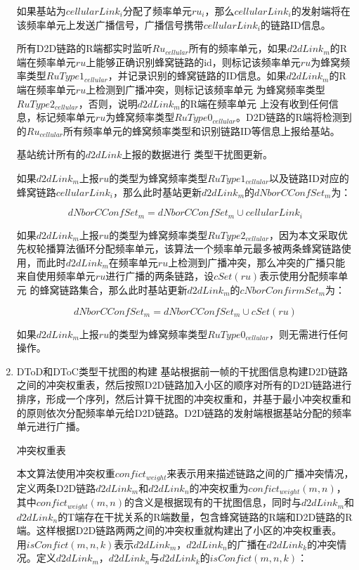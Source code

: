 \documentclass[figurelist,tablelist,algorithmlist,nomlist,masters]{seuthesix}
\begin{document}
\begin{enumerate}
		如果基站为$cellularLin{k_i}$分配了频率单元$r{u_i}$，那么$cellularLin{k_i}$的发射端将在该频率单元上发送广播信号，广播信号携带$cellularLin{k_i}$的链路ID信息。
		
		所有D2D链路的R端都实时监听$R{u_{cellular}}$所有的频率单元，如果$d2dLin{k_m}$的R端在频率单元$ru$上能够正确识别蜂窝链路的id，则标记该频率单元$ru$为蜂窝频率类型$RuType{1_{cellular}}$，并记录识别的蜂窝链路的ID信息。如果$d2dLin{k_m}$的R端在频率单元$ru$上检测到广播冲突，则标记该频率单元 为蜂窝频率类型$RuType{2_{cellular}}$，否则，说明$d2dLin{k_m}$的R端在频率单元 上没有收到任何信息，标记频率单元$ru$为蜂窝频率类型$RuType{0_{cellular}}$。D2D链路的R端将检测到的$R{u_{cellular}}$所有频率单元的蜂窝频率类型和识别链路ID等信息上报给基站。
		
		基站统计所有的$d2dLink$上报的数据进行 类型干扰图更新。
		
		如果$d2dLin{k_m}$上报$ru$的类型为蜂窝频率类型$RuType{1_{cellular}}$以及链路ID对应的蜂窝链路$cellularLin{k_i}$，那么此时基站更新$d2dLin{k_m}$的$dNborCConfSe{t_m}$为：
		
		
		\begin{equation}\label{eq2.1}
		dNborCConfSe{t_m} = dNborCConfSe{t_m} \cup cellularLin{k_i}
		\end{equation}
		
		如果$d2dLin{k_m}$上报$ru$的类型为蜂窝频率类型$RuType{2_{cellular}}$，因为本文采取优先权轮播算法循环分配频率单元，该算法一个频率单元最多被两条蜂窝链路使用，而此时$d2dLin{k_m}$在频率单元$ru$上检测到广播冲突，那么冲突的广播只能来自使用频率单元$ru$进行广播的两条链路，设$cSet(ru)$表示使用分配频率单元 的蜂窝链路集合，那么此时基站更新$d2dLin{k_m}$的$cNborConfirmSe{t_m}$为：
		
		\begin{equation}\label{eq2.1}
		dNborCConfSe{t_m} = dNborCConfSe{t_m} \cup cSet(ru)
		\end{equation}
		
		如果$d2dLin{k_m}$上报$ru$的类型为蜂窝频率类型$RuType{0_{cellular}}$，则无需进行任何操作。
		
		\item DToD和DToC类型干扰图的构建
		基站根据前一帧的干扰图信息构建D2D链路之间的冲突权重表，然后按照D2D链路加入小区的顺序对所有的D2D链路进行排序，形成一个序列，然后计算干扰图的冲突权重和，并基于最小冲突权重和的原则依次分配频率单元给D2D链路。D2D链路的发射端根据基站分配的频率单元进行广播。
		
		冲突权重表
		
		本文算法使用冲突权重$confic{t_{weight}}$来表示用来描述链路之间的广播冲突情况，定义两条D2D链路$d2dLin{k_m}$和$d2dLin{k_n}$的冲突权重为$confic{t_{weight}}(m,n)$，其中$confic{t_{weight}}(m,n)$的含义是根据现有的干扰图信息，同时与$d2dLin{k_m}$和$d2dLin{k_n}$的T端存在干扰关系的R端数量，包含蜂窝链路的R端和D2D链路的R端。这样根据D2D链路两两之间的冲突权重就构建出了小区的冲突权重表。
		用$isConfict(m,n,k)$表示$d2dLin{k_m}$，$d2dLin{k_n}$的广播在$d2dLin{k_k}$的冲突情况。定义$d2dLin{k_m}$，$d2dLin{k_n}$与$d2dLin{k_k}$的$isConfict(m,n,k)$：
		

\end{enumerate}
\end{document}
